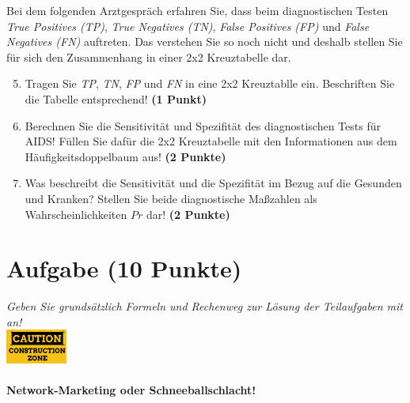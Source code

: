 \documentclass[a4paper, 10pt]{scrartcl}\usepackage[]{graphicx}\usepackage[]{xcolor}
\begin{document}
Bei dem folgenden Arztgespr{\"a}ch erfahren Sie, dass beim diagnostischen
Testen \textit{True Positives (TP)}, \textit{True Negatives (TN)},
\textit{False Positives (FP)} und \textit{False Negatives (FN)}
auftreten. Das verstehen Sie so noch nicht und deshalb stellen Sie f{\"u}r sich
den Zusammenhang in einer 2x2 Kreuztabelle dar.

\begin{enumerate}
  \setcounter{enumi}{4}
\item Tragen Sie \textit{TP}, \textit{TN}, \textit{FP} und \textit{FN} in
  eine 2x2 Kreuztablle ein. Beschriften Sie die Tabelle entsprechend!
  \textbf{(1 Punkt)}
\item Berechnen Sie die Sensitivit{\"a}t und Spezifit{\"a}t des diagnostischen Tests
  f{\"u}r AIDS! F{\"u}llen Sie daf{\"u}r die 2x2 Kreuztabelle mit den Informationen aus
  dem H{\"a}ufigkeitsdoppelbaum aus! \textbf{(2 Punkte)}
\item Was beschreibt die Sensitivit{\"a}t und die Spezifit{\"a}t im Bezug auf die
  Gesunden und Kranken? Stellen Sie beide diagnostische Ma{\ss}zahlen als
  Wahrscheinlichkeiten $Pr$ dar! \textbf{(2 Punkte)} 
\end{enumerate}



 
\clearpage

\section{Aufgabe \hfill (10 Punkte)}

\textit{Geben Sie grunds{\"a}tzlich Formeln und Rechenweg zur L{\"o}sung der
  Teilaufgaben mit an!} \\[1Ex]

\hfill\href{}{\includegraphics[width = 2cm]{img/caution}} %
\hspace{2Ex}

\paragraph{Network-Marketing oder Schneeballschlacht!}
\end{document}
